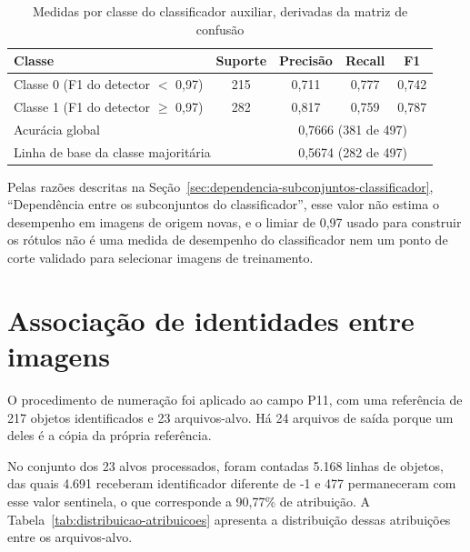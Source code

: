 \begin{table}[htb]
\centering
\caption{Medidas por classe do classificador auxiliar, derivadas da matriz de confus\~ao}
\label{tab:classificador-por-classe}
\small
\begin{tabular}{lcccc}
\hline
\textbf{Classe} & \textbf{Suporte} & \textbf{Precis\~ao} & \textbf{Recall} & \textbf{F1} \\
\hline
Classe 0 (F1 do detector $<$ 0,97) & 215 & 0,711 & 0,777 & 0,742 \\
Classe 1 (F1 do detector $\geq$ 0,97) & 282 & 0,817 & 0,759 & 0,787 \\
\hline
\multicolumn{2}{l}{Acur\'acia global} & \multicolumn{3}{c}{0,7666 (381 de 497)} \\
\multicolumn{2}{l}{Linha de base da classe majorit\'aria} & \multicolumn{3}{c}{0,5674 (282 de 497)} \\
\hline
\end{tabular}
\end{table}

Pelas raz\~oes descritas na Se\c{c}\~ao~\ref{sec:dependencia-subconjuntos-classificador}, ``Depend\^encia entre os subconjuntos do classificador'', esse valor n\~ao estima o desempenho em imagens de origem novas, e o limiar de 0,97 usado para construir os r\'otulos n\~ao \'e uma medida de desempenho do classificador nem um ponto de corte validado para selecionar imagens de treinamento.

\section{Associa\c{c}\~ao de identidades entre imagens}
\label{sec:resultado-associacao-identidades}

O procedimento de numera\c{c}\~ao foi aplicado ao campo P11, com uma refer\^encia de 217 objetos identificados e 23 arquivos-alvo. H\'a 24 arquivos de sa\'ida porque um deles \'e a c\'opia da pr\'opria refer\^encia.

No conjunto dos 23 alvos processados, foram contadas 5.168 linhas de objetos, das quais 4.691 receberam identificador diferente de -1 e 477 permaneceram com esse valor sentinela, o que corresponde a 90,77\% de atribui\c{c}\~ao. A Tabela~\ref{tab:distribuicao-atribuicoes} apresenta a distribui\c{c}\~ao dessas atribui\c{c}\~oes entre os arquivos-alvo.

